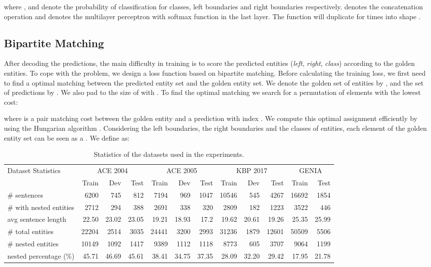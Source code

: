 \documentclass{article}
\begin{document}
where ,  and  denote the probability of classification for classes, left boundaries and right boundaries respectively.  denotes the concatenation operation and  denotes the multilayer perceptron with softmax function in the last layer. The function  will duplicate  for  times into shape . 


\subsection{Bipartite Matching}
After decoding the  predictions, the main difficulty in training is to score the predicted entities (\textit{left}, \textit{right}, \textit{class}) according to the golden entities. To cope with the problem, we design a loss function based on bipartite matching. Before calculating the training loss, we first need to find a optimal matching between the predicted entity set and the golden entity set. We denote the golden set of entities by , and the set of  predictions by . We also pad  to the size of  with . To find the optimal matching we search for a permutation of  elements  with the lowest cost: 


where  is a pair matching cost between the golden entity  and a prediction with index . We compute this optimal assignment efficiently by using the Hungarian algorithm \cite{kuhn1955hungarian}. Considering the left boundaries, the right boundaries and the classes of entities, each element  of the golden entity set can be seen as a . We define  as:

\begin{table*}
\centering
\begin{tabular}{lrrrrrrrrrrr}
\toprule
\multirow{2}{*}{Dataset Statistics}   & \multicolumn{3}{c}{ACE 2004}& \multicolumn{3}{c}{ACE 2005} & \multicolumn{3}{c}{KBP 2017} & \multicolumn{2}{c}{GENIA}  \\
 \cmidrule(lr){2-4}  \cmidrule(lr){5-7} \cmidrule(lr){8-10} \cmidrule(lr){11-12}  
& Train  & Dev & Test & Train  & Dev & Test & Train  & Dev & Test & Train   & Test  \\
\midrule
\# sentences &  6200 &  745 &  812 &  7194 &  969 &  1047 &  10546 &  545 & 4267 &  16692 &   1854 \\
\# with nested entities  &  2712 &  294 &  388 &  2691 &  338 &  320 &  2809 &  182 &  1223 &  3522 &   446 \\
avg sentence length &  22.50 &  23.02 &  23.05 &  19.21 &  18.93 &  17.2 &  19.62 &  20.61 &  19.26 &  25.35 &    25.99 \\
\# total entities &  22204 &  2514 &  3035 &  24441 &  3200 &  2993 &  31236 &  1879 &  12601 &  50509 &    5506 \\
\# nested entities &  10149 &  1092 & 1417  & 9389 &  1112 &  1118 &  8773 &  605 &  3707 &  9064 &    1199 \\
 nested percentage (\%) &  45.71 & 46.69 &  45.61 & 38.41 & 34.75 &  37.35 &  28.09 & 32.20 &  29.42 &  17.95 &    21.78 \\
\bottomrule

\end{tabular}
\caption{Statistics of the datasets used in the experiments.}
\label{tab:statistics}
\end{table*}
\end{document}
